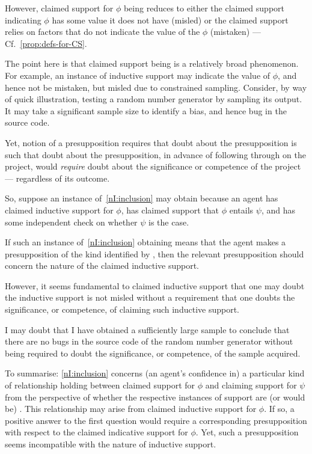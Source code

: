 \begin{note}
  However, claimed support for \(\phi\) being \mom{} reduces to either the claimed support indicating \(\phi\) has some value it does not have (misled) or the claimed support relies on factors that do not indicate the value of the \(\phi\) (mistaken) --- Cf.~\autoref{prop:defs-for-CS}.

  The point here is that claimed support being \mom{} is a relatively broad phenomenon.
  For example, an instance of inductive support may indicate the value of \(\phi\), and hence not be mistaken, but misled due to constrained sampling.
  Consider, by way of quick illustration, testing a random number generator by sampling its output.
  It may take a significant sample size to identify a bias, and hence bug in the source code.

  Yet, \citeauthor{Wright:2011wn} notion of a presupposition requires that doubt about the presupposition is such that doubt about the presupposition, in advance of following through on the project, would \emph{require} doubt about the significance or competence of the project --- regardless of its outcome.

  So, suppose an instance of~\ref{nI:inclusion} may obtain because an agent has claimed inductive support for \(\phi\), has claimed support that \(\phi\) entails \(\psi\), and has some independent check on whether \(\psi\) is the case.

  If such an instance of~\ref{nI:inclusion} obtaining means that the agent makes a presupposition of the kind identified by \wrt{}, then the relevant presupposition should concern the nature of the claimed inductive support.

  However, it seems fundamental to claimed inductive support that one may doubt the inductive support is not misled without a requirement that one doubts the significance, or competence, of claiming such inductive support.

  I may doubt that I have obtained a sufficiently large sample to conclude that there are no bugs in the source code of the random number generator without being required to doubt the significance, or competence, of the sample acquired.
\end{note}

\begin{note}
  To summarise:
  \ref{nI:inclusion} concerns (an agent's confidence in) a particular kind of relationship holding between claimed support for \(\phi\) and claiming support for \(\psi\) from the perspective of whether the respective instances of support are (or would be) \mom{}.
  This relationship may arise from claimed inductive support for \(\phi\).
  If so, a positive answer to the first question would require a corresponding presupposition with respect to the claimed indicative support for \(\phi\).
  Yet, such a presupposition seems incompatible with the nature of inductive support.
\end{note}

